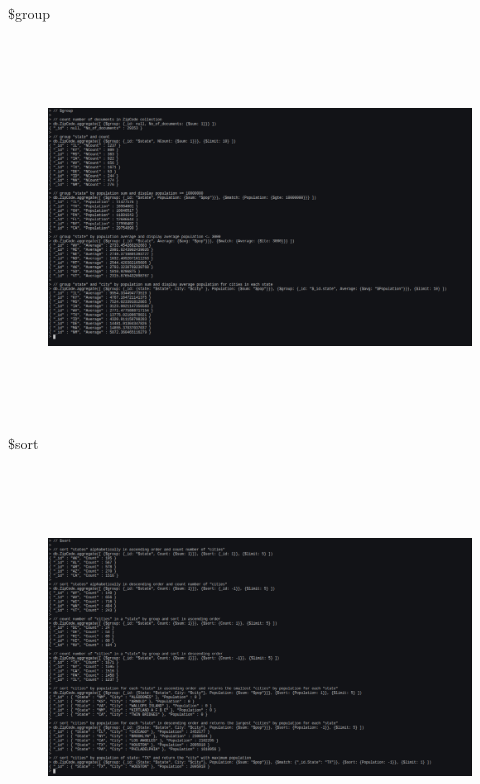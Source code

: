 \documentclass[a4paper,11pt,openright]{report}
\begin{document}
{\footnotesize $\$$group}
\begin{figure}[ht!]
\includegraphics[width=20cm,height=10cm,keepaspectratio]{image5.pdf}
\centering
\end{figure}

\vspace{20px}

{\footnotesize $\$$sort}
\begin{figure}[ht!]
\includegraphics[width=20cm,height=10cm,keepaspectratio]{image6.pdf}
\centering
\end{figure}

\pagebreak
\end{document}
